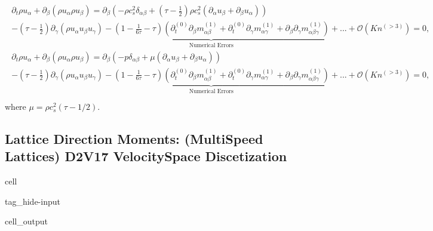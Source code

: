 \documentclass[letterpaper,10pt,english,openany,oneside]{jupyterBook}
\begin{document}
\begin{equation*}
\begin{split}
\begin{array}{l}
\partial_t \rho u_{\alpha} + \partial_{\beta}\left(\rho u_{\alpha}\rho u_{\beta}\right) =  \partial_{\beta}\left( -\rho c_{s}^{2} \delta_{\alpha\beta} + \left(\tau-\displaystyle\frac{1}{2}\right) \rho c_{s}^{2}\left(\partial_{\alpha}u_{\beta}+\partial_{\beta}u_{\alpha}\right) \right) \\
 \underbrace{ -\left(\tau-\displaystyle\frac{1}{2}\right)  \partial_{\gamma} (\rho u_{\alpha}u_{\beta}u_{\gamma}) - \displaystyle\left(1 - \frac{1}{6\tau} - \tau\right) \left( \partial_{t}^{(0)}\partial_{\beta} m^{(1)}_{\alpha\beta} + \partial_{t}^{(0)}\partial_{\gamma} m^{(1)}_{\alpha\gamma} + \partial_{\beta}\partial_{\gamma} m^{(1)}_{\alpha\beta\gamma} \right) + ... + \mathcal{O}(Kn^{(> 3)}) }_{\textrm{Numerical Errors}} =0,\\
\partial_t \rho u_{\alpha} + \partial_{\beta}\left(\rho u_{\alpha}\rho u_{\beta}\right) =  \partial_{\beta}\left( -p \delta_{\alpha\beta} + \mu\left(\partial_{\alpha}u_{\beta}+\partial_{\beta}u_{\alpha}\right) \right) \\
\underbrace{ -\left(\tau-\displaystyle\frac{1}{2}\right)  \partial_{\gamma} (\rho u_{\alpha}u_{\beta}u_{\gamma}) - \displaystyle\left(1 - \frac{1}{6\tau} - \tau\right) \left( \partial_{t}^{(0)}\partial_{\beta} m^{(1)}_{\alpha\beta} + \partial_{t}^{(0)}\partial_{\gamma} m^{(1)}_{\alpha\gamma} + \partial_{\beta}\partial_{\gamma} m^{(1)}_{\alpha\beta\gamma} \right) + ... + \mathcal{O}(Kn^{(> 3)}) }_{\textrm{Numerical Errors}} =0,\\
\end{array}
\end{split}
\end{equation*}
\sphinxAtStartPar
where \(\mu=\rho c_{s}^{2}(\tau-1/2)\).


\subsection{Lattice Direction Moments: (Multi\sphinxhyphen{}Speed Lattices) D2V17 Velocity\sphinxhyphen{}Space Discetization}
\label{\detokenize{Refs/LBM-Study/intro-nse-lbm/Navier-Stokes-Equation:lattice-direction-moments-multi-speed-lattices-d2v17-velocity-space-discetization}}
\begin{sphinxuseclass}{cell}
\begin{sphinxuseclass}{tag_hide-input}\begin{sphinxVerbatimOutput}

\begin{sphinxuseclass}{cell_output}
\noindent{}

\end{sphinxuseclass}\end{sphinxVerbatimOutput}

\end{sphinxuseclass}
\end{sphinxuseclass}
\end{document}
